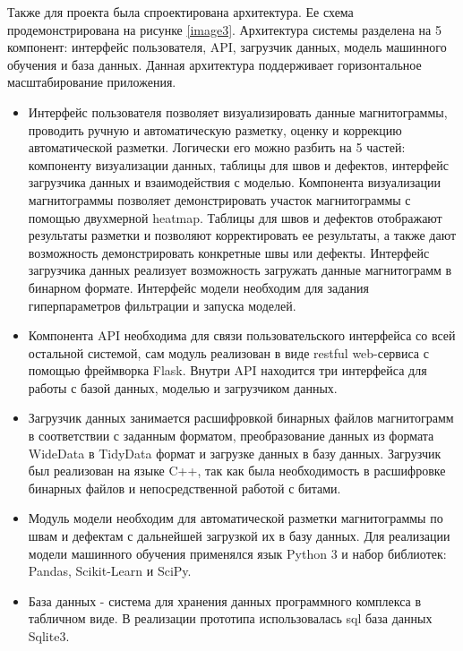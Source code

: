 \documentclass[a4paper,article,14pt]{extarticle}
\begin{document}
Также для проекта была спроектирована архитектура. Ее схема продемонстрирована на рисунке \ref{image3}. 
Архитектура системы разделена на 5 компонент: интерфейс пользователя, API,  
загрузчик данных, модель машинного обучения и база данных. 
Данная архитектура поддерживает горизонтальное  масштабирование приложения.

\begin{itemize}
    \item Интерфейс пользователя позволяет визуализировать данные магнитограммы, проводить ручную и автоматическую разметку, оценку и коррекцию автоматической разметки. Логически его можно разбить на 5 частей: компоненту визуализации данных, таблицы для швов и дефектов, интерфейс загрузчика данных и взаимодействия с моделью. Компонента визуализации магнитограммы позволяет демонстрировать участок магнитограммы с помощью двухмерной heatmap. Таблицы для швов и дефектов отображают результаты разметки и позволяют корректировать ее результаты, а также дают возможность демонстрировать конкретные швы или дефекты. Интерфейс загрузчика данных реализует возможность загружать данные магнитограмм в бинарном формате. Интерфейс модели необходим для задания гиперпараметров фильтрации и запуска моделей.
    \item Компонента API необходима для связи пользовательского интерфейса со всей остальной системой, сам модуль реализован в виде restful web-сервиса с помощью  фреймворка Flask. Внутри API находится три интерфейса для работы с базой данных, моделью и загрузчиком данных.
    \item Загрузчик данных занимается расшифровкой бинарных файлов магнитограмм в соответствии с заданным форматом, преобразование данных из формата WideData в TidyData формат  и загрузке данных в базу данных. Загрузчик был реализован на языке C++, так как была необходимость в расшифровке бинарных файлов и непосредственной работой с битами.
    \item Модуль модели необходим для автоматической разметки магнитограммы по швам и дефектам с дальнейшей загрузкой их в базу данных. Для реализации модели машинного обучения применялся язык Python 3 и набор библиотек: Pandas, Scikit-Learn и SciPy.
    \item База данных - система для хранения данных программного комплекса в табличном виде. В реализации прототипа использовалась sql база данных Sqlite3. 
\end{itemize}
\end{document}
